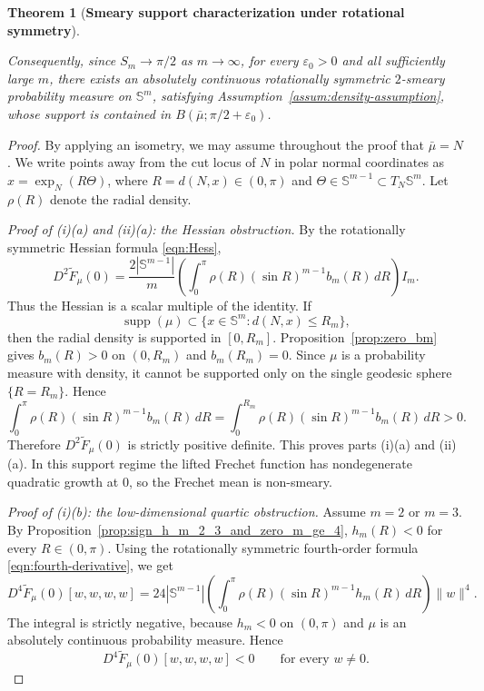 \documentclass{amsart}
\newtheorem{theorem}{Theorem}[section]
\theoremstyle{definition}
\theoremstyle{remark}
\newcommand{\mubar}{\bar{\mu}}
\newcommand\0{\boldsymbol{0}}
\begin{document}
\begin{theorem}[\textbf{Smeary support characterization under rotational symmetry}]
\begin{enumerate}
Consequently, since \(S_m\to\pi/2\) as \(m\to\infty\), for every \(\varepsilon_0>0\) and all sufficiently large \(m\), there exists an absolutely continuous rotationally symmetric \(2\)-smeary probability measure on \(\mathbb S^m\), satisfying Assumption~\ref{assum:density-assumption}, whose support is contained in \(B(\mubar;\pi/2+\varepsilon_0)\).
\end{enumerate}
\end{theorem}

\begin{proof}
By applying an isometry, we may assume throughout the proof that \(\mubar=N\). We write points away from the cut locus of \(N\) in polar normal coordinates as \(x=\exp_N(R\Theta)\), where \(R=d(N,x)\in(0,\pi)\) and \(\Theta\in\mathbb S^{m-1}\subset T_N\mathbb S^m\). Let \(\rho(R)\) denote the radial density.

\emph{Proof of (i)(a) and (ii)(a): the Hessian obstruction.}
By the rotationally symmetric Hessian formula \eqref{eqn:Hess},
\[
D^2\widetilde F_\mu(0)
=
\frac{2|\mathbb S^{m-1}|}{m}
\left(\int_0^\pi \rho(R)(\sin R)^{m-1}b_m(R)\,dR\right)I_m .
\]
Thus the Hessian is a scalar multiple of the identity. If
\[
\operatorname{supp}(\mu)\subset \{x\in\mathbb S^m:d(N,x)\le R_m\},
\]
then the radial density is supported in \([0,R_m]\). Proposition~\ref{prop:zero_bm} gives \(b_m(R)>0\) on \((0,R_m)\) and \(b_m(R_m)=0\). Since \(\mu\) is a probability measure with density, it cannot be supported only on the single geodesic sphere \(\{R=R_m\}\). Hence
\[
\int_0^\pi \rho(R)(\sin R)^{m-1}b_m(R)\,dR
=
\int_0^{R_m}\rho(R)(\sin R)^{m-1}b_m(R)\,dR>0.
\]
Therefore \(D^2\widetilde F_\mu(0)\) is strictly positive definite. This proves parts (i)(a) and (ii)(a). In this support regime the lifted Frechet function has nondegenerate quadratic growth at \(0\), so the Frechet mean is non-smeary.

\emph{Proof of (i)(b): the low-dimensional quartic obstruction.}
Assume \(m=2\) or \(m=3\). By Proposition~\ref{prop:sign_h_m_2_3_and_zero_m_ge_4}, \(h_m(R)<0\) for every \(R\in(0,\pi)\). Using the rotationally symmetric fourth-order formula \eqref{eqn:fourth-derivative}, we get
\[
D^4\widetilde F_\mu(0)[w,w,w,w]
=
24|\mathbb S^{m-1}|
\left(\int_0^\pi \rho(R)(\sin R)^{m-1}h_m(R)\,dR\right)\|w\|^4 .
\]
The integral is strictly negative, because \(h_m<0\) on \((0,\pi)\) and \(\mu\) is an absolutely continuous probability measure. Hence
\[
D^4\widetilde F_\mu(0)[w,w,w,w]<0
\qquad\text{for every }w\neq0.
\]


\end{proof}
\end{document}
